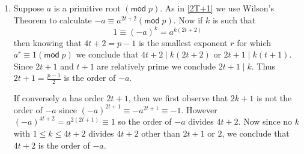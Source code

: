 \documentclass[12pt]{article}
\renewcommand{\pmod}[1]{\left(\mathsf{mod}\;#1\right)}
\begin{document}
\begin{enumerate}
\item %
Suppose $a$ is a primitive root $\pmod{p}$. As in \autoref{2T+1}
we use Wilson's Theorem to calculate $-a\equiv a^{2t+2}\pmod{p}$.
Now if $k$ is such that
\[1\equiv\left(-a\right)^k=a^{k\left(2t+2\right)}\]
then knowing that $4t+2=p-1$ is the smallest exponent $r$ for
which $a^r\equiv 1\pmod{p}$ we conclude that
$4t+2\mid k\left(2t+2\right)$ or $2t+1\mid k\left(t+1\right)$.
Since $2t+1$ and $t+1$ are relatively prime we conclude $2t+1\mid k$.
Thus $2t+1=\frac{p-1}{2}$ is the order of $-a$.

If conversely $a$ has order $2t+1$, then we first observe that
$2k+1$ is not the order of $-a$ since $\left(-a\right)^{2t+1}
\equiv -a^{2t+1}\equiv -1$.
However $\left(-a\right)^{4t+2}=a^{2\left(2t+1\right)}\equiv 1$
so the order of $-a$ divides $4t+2$. Now since no
$k$ with $1\le k\le 4t+2$ divides $4t+2$ other than $2t+1$ or $2$,
we conclude that $4t+2$ is the order of $-a$.
\end{enumerate}
\end{document}
